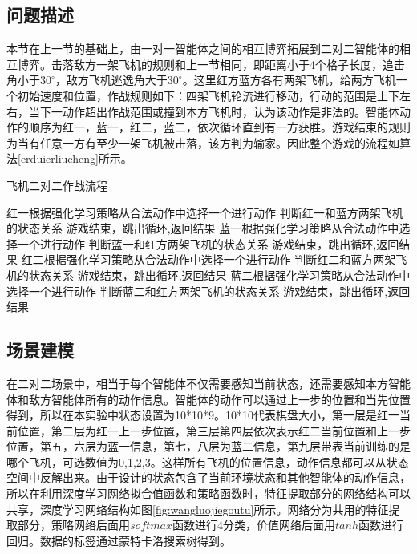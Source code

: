\subsection{问题描述}
本节在上一节的基础上，由一对一智能体之间的相互博弈拓展到二对二智能体的相互博弈。击落敌方一架飞机的规则和上一节相同，即距离小于4个格子长度，追击角小于$30^\circ$，敌方飞机逃逸角大于$30^\circ$。这里红方蓝方各有两架飞机，给两方飞机一个初始速度和位置，作战规则如下：四架飞机轮流进行移动，行动的范围是上下左右，当下一动作超出作战范围或撞到本方飞机时，认为该动作是非法的。智能体动作的顺序为红一，蓝一，红二，蓝二，依次循环直到有一方获胜。游戏结束的规则为当有任意一方有至少一架飞机被击落，该方判为输家。因此整个游戏的流程如算法\ref{erduierliucheng}所示。
\begin{algorithm}[htbp]
	\caption{飞机二对二作战流程}%
	\label{erduierliucheng}
	\begin{algorithmic}[1]%
		\State 红一根据强化学习策略从合法动作中选择一个进行动作
		\State 判断红一和蓝方两架飞机的状态关系
		\State 游戏结束，跳出循环,返回结果
		\EndIf
		\State 蓝一根据强化学习策略从合法动作中选择一个进行动作
		\State 判断蓝一和红方两架飞机的状态关系
		\State 游戏结束，跳出循环,返回结果
		\EndIf
		\State 红二根据强化学习策略从合法动作中选择一个进行动作
		\State 判断红二和蓝方两架飞机的状态关系
		\State 游戏结束，跳出循环,返回结果
		\EndIf
		\State 蓝二根据强化学习策略从合法动作中选择一个进行动作
		\State 判断蓝二和红方两架飞机的状态关系
		\State 游戏结束，跳出循环,返回结果
		\EndIf
		\EndFor
	\end{algorithmic}
\end{algorithm}

\subsection{场景建模}

在二对二场景中，相当于每个智能体不仅需要感知当前状态，还需要感知本方智能体和敌方智能体所有的动作信息。智能体的动作可以通过上一步的位置和当先位置得到，所以在本实验中状态设置为10*10*9。10*10代表棋盘大小，第一层是红一当前位置，第二层为红一上一步位置，第三层第四层依次表示红二当前位置和上一步位置，第五，六层为蓝一信息，第七，八层为蓝二信息，第九层带表当前训练的是哪个飞机，可选数值为0,1,2,3。这样所有飞机的位置信息，动作信息都可以从状态空间中反解出来。由于设计的状态包含了当前环境状态和其他智能体的动作信息，所以在利用深度学习网络拟合值函数和策略函数时，特征提取部分的网络结构可以共享，深度学习网络结构如图\ref{fig:wangluojiegoutu}所示。网络分为共用的特征提取部分，策略网络后面用$softmax$函数进行4分类，价值网络后面用$tanh$函数进行回归。数据的标签通过蒙特卡洛搜索树得到。

